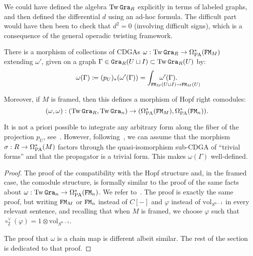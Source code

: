 \begin{remark}
  We could have defined the algebra $\operatorname{Tw}\mathtt{Gra}_{R}$ explicitly in terms of labeled graphs, and then defined the differential $d$ using an ad-hoc formula.
  The difficult part would have then been to check that $d^{2} = 0$ (involving difficult signs), which is a consequence of the general operadic twisting framework.
\end{remark}

\begin{proposition}
  \label{cnf.prop.mph-tw-om}
  There is a morphism of collections of CDGAs $\omega : \operatorname{Tw}\mathtt{Gra}_{R} \to \Omega_{\mathrm{PA}}^{*}(\mathtt{FM}_{M})$ extending $\omega'$, given on a graph $\Gamma \in \mathtt{Gra}_{R}(U \sqcup I) \subset \operatorname{Tw}\mathtt{Gra}_{R}(U)$ by:
  \[ \omega(\Gamma) \coloneqq (p_{U})_{*}(\omega'(\Gamma)) = \int_{\mathrlap{\FM_{M}(U \sqcup I) \to \FM_{M}(U)}} \quad \omega'(\Gamma). \]

  Moreover, if $M$ is framed, then this defines a morphism of Hopf right comodules:
  \[ (\omega, \omega) : (\operatorname{Tw}\mathtt{Gra}_{R}, \operatorname{Tw}\mathtt{Gra}_{n}) \to (\Omega_{\mathrm{PA}}^{*}(\mathtt{FM}_{M}), \Omega_{\mathrm{PA}}^{*}(\mathtt{FM}_{n})). \]
\end{proposition}

\begin{remark}
  \label{cnf.rmk.triv-forms}
  It is not a priori possible to integrate any arbitrary form along the fiber of the projection $p_{U}$, see~\cite[Section~9.4]{HardtLambrechtsTurchinVolic2011}.
  However, following~\cite[Appendix~C]{CamposWillwacher2016}, we can assume that the morphism $\sigma : R \to \Omega_{\mathrm{PA}}^{*}(M)$ factors through the quasi-isomorphism sub-CDGA of ``trivial forms'' and that the propagator is a trivial form.
  This makes $\omega(\Gamma)$ well-defined.
\end{remark}

\begin{proof}
  The proof of the compatibility with the Hopf structure and, in the framed case, the comodule structure, is formally similar to the proof of the same facts about $\omega : \operatorname{Tw}\mathtt{Gra}_{n} \to \Omega_{\mathrm{PA}}^{*}(\mathtt{FM}_{n})$.
  We refer to~\cite[Sections 9.2, 9.5]{LambrechtsVolic2014}.
  The proof is exactly the same proof, but writing $\mathtt{FM}_{M}$ or $\mathtt{FM}_{n}$ instead of $C[-]$ and $\varphi$ instead of $\mathrm{vol}_{S^{n-1}}$ in every relevant sentence, and recalling that when $M$ is framed, we choose $\varphi$ such that $\circ_{\underline{2}}^{\vee}(\varphi) = 1 \otimes \mathrm{vol}_{S^{n-1}}$.

  The proof that $\omega$ is a chain map is different albeit similar.
  The rest of the section is dedicated to that proof.
\end{proof}

